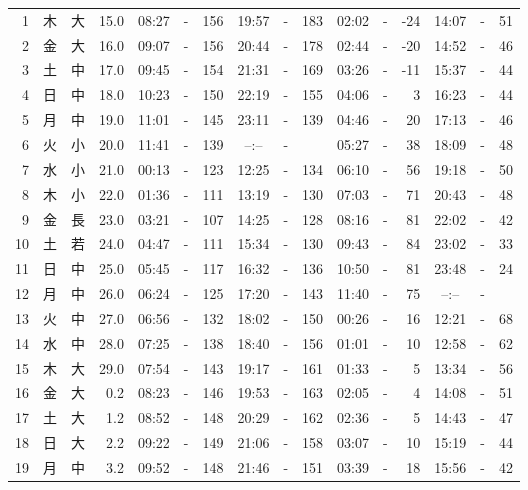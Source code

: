 \documentclass[12pt.a4j]{jsarticle}
\begin{document}
\begin{center}
\begin{table}[ht]
\begin{tabular}{|rc|cr|ccrccr|ccrccr|}
 \hline
 1 & 木 & 大 & 15.0 &  08:27 &-& 156  &  19:57 &-& 183  &   02:02 &-& -24  &   14:07 &-&  51  \\
 2 & 金 & 大 & 16.0 &  09:07 &-& 156  &  20:44 &-& 178  &   02:44 &-& -20  &   14:52 &-&  46  \\
 3 & 土 & 中 & 17.0 &  09:45 &-& 154  &  21:31 &-& 169  &   03:26 &-& -11  &   15:37 &-&  44  \\
 4 & 日 & 中 & 18.0 &  10:23 &-& 150  &  22:19 &-& 155  &   04:06 &-&   3  &   16:23 &-&  44  \\
 5 & 月 & 中 & 19.0 &  11:01 &-& 145  &  23:11 &-& 139  &   04:46 &-&  20  &   17:13 &-&  46  \\
 6 & 火 & 小 & 20.0 &  11:41 &-& 139  &  --:-- &-&     &   05:27 &-&  38  &   18:09 &-&  48  \\
 7 & 水 & 小 & 21.0 &  00:13 &-& 123  &  12:25 &-& 134  &   06:10 &-&  56  &   19:18 &-&  50  \\
 8 & 木 & 小 & 22.0 &  01:36 &-& 111  &  13:19 &-& 130  &   07:03 &-&  71  &   20:43 &-&  48  \\
 9 & 金 & 長 & 23.0 &  03:21 &-& 107  &  14:25 &-& 128  &   08:16 &-&  81  &   22:02 &-&  42  \\
10 & 土 & 若 & 24.0 &  04:47 &-& 111  &  15:34 &-& 130  &   09:43 &-&  84  &   23:02 &-&  33  \\
11 & 日 & 中 & 25.0 &  05:45 &-& 117  &  16:32 &-& 136  &   10:50 &-&  81  &   23:48 &-&  24  \\
12 & 月 & 中 & 26.0 &  06:24 &-& 125  &  17:20 &-& 143  &   11:40 &-&  75  &   --:-- &-&     \\
13 & 火 & 中 & 27.0 &  06:56 &-& 132  &  18:02 &-& 150  &   00:26 &-&  16  &   12:21 &-&  68  \\
14 & 水 & 中 & 28.0 &  07:25 &-& 138  &  18:40 &-& 156  &   01:01 &-&  10  &   12:58 &-&  62  \\
15 & 木 & 大 & 29.0 &  07:54 &-& 143  &  19:17 &-& 161  &   01:33 &-&   5  &   13:34 &-&  56  \\
16 & 金 & 大 &  0.2 &  08:23 &-& 146  &  19:53 &-& 163  &   02:05 &-&   4  &   14:08 &-&  51  \\
17 & 土 & 大 &  1.2 &  08:52 &-& 148  &  20:29 &-& 162  &   02:36 &-&   5  &   14:43 &-&  47  \\
18 & 日 & 大 &  2.2 &  09:22 &-& 149  &  21:06 &-& 158  &   03:07 &-&  10  &   15:19 &-&  44  \\
19 & 月 & 中 &  3.2 &  09:52 &-& 148  &  21:46 &-& 151  &   03:39 &-&  18  &   15:56 &-&  42  \\

\end{tabular}
\end{table}
\end{center}
\end{document}
